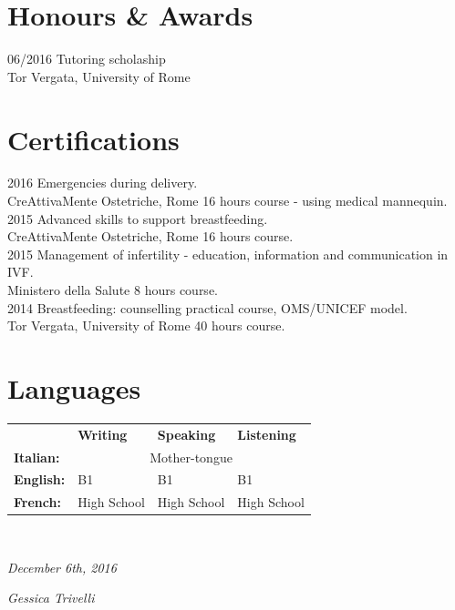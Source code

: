 \documentclass[11pt, print]{friggeri-cv}
\begin{document}
\section{Honours \& Awards}
\begin{entrylist}
	\entry
	{06/2016}
	{Tutoring scholaship}
	{\\Tor Vergata, University of Rome}
	{}
	{}
\end{entrylist}
\vspace{-35pt}
\section{Certifications}
\begin{entrylist}
  \entry
	  {2016}
	  {Emergencies during delivery.}
	  {\\CreAttivaMente Ostetriche, Rome}
	  {16 hours course - using medical mannequin.\\}
  \entry
	  {2015}
	  {Advanced skills to support breastfeeding.}
	  {\\CreAttivaMente Ostetriche, Rome}
	  {16 hours course.\\}
  \entry
	  {2015}
	  {Management of infertility - education, information and communication in IVF.}
	  {\\Ministero della Salute}
	  {8 hours course.\\}
  \entry
  {2014}
  {Breastfeeding: counselling practical course, OMS/UNICEF model.}
  {\\Tor Vergata, University of Rome}
  {40 hours course.\\}
\end{entrylist}
\vspace{-20pt}
\section{Languages}
\begin{table}[!h]
	\centering
	\begin{tabular}{ p{3cm} p{3cm} p{3cm} p{3cm} }
		& \textbf{Writing} 	& \textbf{Speaking} & \textbf{Listening}			\\ 
		\textbf{Italian:}	& \multicolumn{3}{c}{Mother-tongue}					\\ 
		\textbf{English:} 	& B1 				& B1 			& B1			\\ 
		\textbf{French:}	& High School 		& High School	& High School	\\
	\end{tabular}
\end{table}
~
\begin{flushleft}
\emph{December 6th, 2016}
\end{flushleft}
\begin{flushright}
\emph{Gessica Trivelli}
\end{flushright}
\end{document}
